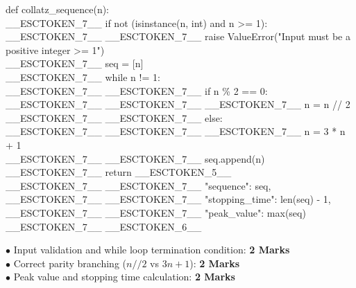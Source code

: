 \begin{solutionbox}
\begin{pycode}
def collatz\_sequence(n):\\
\_\_ESCTOKEN\_7\_\_ if not (isinstance(n, int) and n >= 1):\\
\_\_ESCTOKEN\_7\_\_ \_\_ESCTOKEN\_7\_\_ raise ValueError("Input must be a positive integer >= 1")\\
\_\_ESCTOKEN\_7\_\_ seq = [n]\\
\_\_ESCTOKEN\_7\_\_ while n != 1:\\
\_\_ESCTOKEN\_7\_\_ \_\_ESCTOKEN\_7\_\_ if n \% 2 == 0:\\
\_\_ESCTOKEN\_7\_\_ \_\_ESCTOKEN\_7\_\_ \_\_ESCTOKEN\_7\_\_ n = n // 2\\
\_\_ESCTOKEN\_7\_\_ \_\_ESCTOKEN\_7\_\_ else:\\
\_\_ESCTOKEN\_7\_\_ \_\_ESCTOKEN\_7\_\_ \_\_ESCTOKEN\_7\_\_ n = 3 * n + 1\\
\_\_ESCTOKEN\_7\_\_ \_\_ESCTOKEN\_7\_\_ seq.append(n)\\
\_\_ESCTOKEN\_7\_\_ return \_\_ESCTOKEN\_5\_\_\\
\_\_ESCTOKEN\_7\_\_ \_\_ESCTOKEN\_7\_\_ "sequence": seq,\\
\_\_ESCTOKEN\_7\_\_ \_\_ESCTOKEN\_7\_\_ "stopping\_time": len(seq) - 1,\\
\_\_ESCTOKEN\_7\_\_ \_\_ESCTOKEN\_7\_\_ "peak\_value": max(seq)\\
\_\_ESCTOKEN\_7\_\_ \_\_ESCTOKEN\_6\_\_
\end{pycode}
\begin{markingrubric}
$\bullet$ Input validation and while loop termination condition: \textbf{2 Marks}\\
$\bullet$ Correct parity branching ($n//2$ vs $3n+1$): \textbf{2 Marks}\\
$\bullet$ Peak value and stopping time calculation: \textbf{2 Marks}
\end{markingrubric}
\end{solutionbox}

